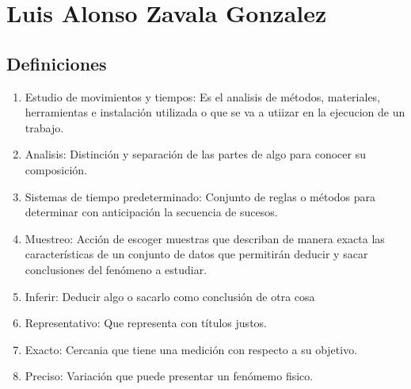 \section{Luis Alonso Zavala Gonzalez}
\subsection{Definiciones}

\begin{enumerate}
    \item Estudio de movimientos y tiempos: Es el analisis de métodos, materiales, herramientas e instalación utilizada o que se va a utiizar en la ejecucion de un trabajo.
    \item Analisis: Distinción y separación de las partes de algo para conocer su composición.
    \item Sistemas de tiempo predeterminado: Conjunto de reglas o métodos para determinar con anticipación la secuencia de sucesos.
    \item Muestreo: Acción de escoger muestras que describan de manera exacta las características de un conjunto de datos que permitirán deducir y sacar conclusiones del fenómeno a estudiar.
    \item Inferir: Deducir algo o sacarlo como conclusión de otra cosa
    \item Representativo: Que representa con títulos justos.
    \item Exacto: Cercania que tiene una medición con respecto a su objetivo.
    \item Preciso: Variación que puede presentar un fenómemo fisico.
\end{enumerate}







